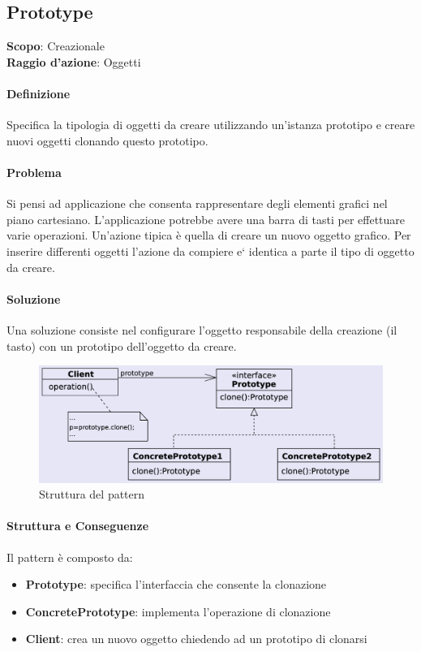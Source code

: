 \subsection{Prototype}


\textbf{Scopo}: Creazionale \\
\textbf{Raggio d'azione}: Oggetti

\paragraph{Definizione} Specifica la tipologia di oggetti da creare utilizzando un'istanza prototipo e creare nuovi oggetti clonando questo prototipo.

\paragraph{Problema} Si pensi ad applicazione che consenta rappresentare degli elementi grafici nel piano cartesiano. L’applicazione potrebbe avere una barra di tasti per effettuare varie operazioni. Un’azione tipica è quella di creare un nuovo oggetto grafico. Per inserire differenti oggetti l’azione da compiere e` identica a parte il tipo di oggetto da creare.

\paragraph{Soluzione} Una soluzione consiste nel configurare l’oggetto responsabile della creazione (il tasto) con un prototipo dell’oggetto da creare.

\begin{figure}[H]
    \centering
    \includegraphics[width=0.75\linewidth]{assets/pattern/prototype/prototype-struttura.png}
    \caption{Struttura del pattern}
\end{figure}

\paragraph{Struttura e Conseguenze} Il pattern è composto da:
\begin{itemize}
    \item \textbf{Prototype}: specifica l'interfaccia che consente la clonazione
    \item \textbf{ConcretePrototype}: implementa l'operazione di clonazione
    \item \textbf{Client}: crea un nuovo oggetto chiedendo ad un prototipo di clonarsi
\end{itemize}

